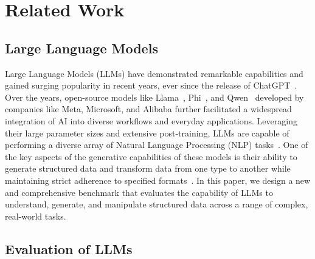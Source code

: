 \section{Related Work}
\label{sec:related}

\subsection{Large Language Models}

Large Language Models (LLMs) have demonstrated remarkable capabilities and gained surging popularity in recent years, ever since the release of ChatGPT~\citep{OpenAI2023ChatGPT}. Over the years, open-source models like Llama~\citep{grattafiori2024llama3herdmodels}, Phi~\citep{abdin2024phi4technicalreport,abdin2024phi3technicalreporthighly}, and Qwen~\citep{yang2024qwen2technicalreport,yang2025qwen3technicalreport} developed by companies like Meta, Microsoft, and Alibaba further facilitated a widespread integration of AI into diverse workflows and everyday applications. Leveraging their large parameter sizes and extensive post-training, LLMs are capable of performing a diverse array of Natural Language Processing (NLP) tasks~\citep{wan2023gptreincontextlearningrelation}. One of the key aspects of the generative capabilities of these models is their ability to generate structured data and transform data from one type to another while maintaining strict adherence to specified formats~\citep{guo2024large}. In this paper, we design a new and comprehensive benchmark that evaluates the capability of LLMs to understand, generate, and manipulate structured data across a range of complex, real-world tasks.


\subsection{Evaluation of LLMs}


